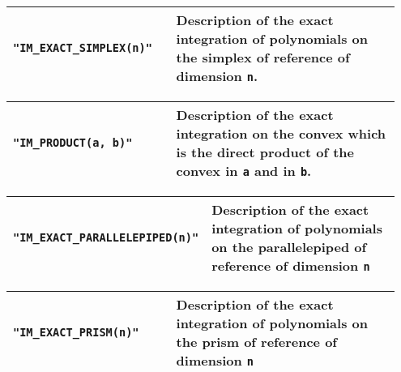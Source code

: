 \begin{center} \begin{tabular}{|m{0.4\linewidth}|m{0.55\linewidth}|} \hline
{\tt "IM\_EXACT\_SIMPLEX(n)"} & Description of the exact integration of polynomials on the simplex of reference of dimension {\tt n}. \\ \hline
\end{tabular}  
\begin{tabular}{|m{0.4\linewidth}|m{0.55\linewidth}|} \hline
{\tt "IM\_PRODUCT(a, b)"} & Description of the exact integration on the convex which is the direct product of the convex in {\tt a} and in {\tt b}.\\ \hline
\end{tabular}  
\begin{tabular}{|m{0.4\linewidth}|m{0.55\linewidth}|} \hline
{\tt "IM\_EXACT\_PARALLELEPIPED(n)"} & Description of the exact integration of polynomials on the parallelepiped of reference of dimension {\tt n}\\ \hline
\end{tabular}  
\begin{tabular}{|m{0.4\linewidth}|m{0.55\linewidth}|} \hline
{\tt "IM\_EXACT\_PRISM(n)"} & Description of the exact integration of polynomials on the prism of reference of dimension {\tt n}\\ \hline
\end{tabular} \end{center}

